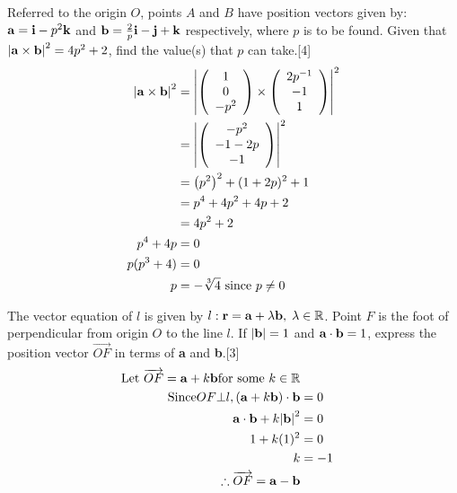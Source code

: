 \documentclass[12pt, a4 paper]{article}
\begin{document}
\begin{outline}[enumerate]
	\color{black}
	\1 Referred to the origin $O$, points $A$ and $B$ have position vectors given by: ${\bf{a}} = {\bf{i}} - {p^2}{\bf{k}}$ and ${\bf{b}} = \frac{2}{p}{\bf{i}} - {\bf{j}} + {\bf{k}}$ respectively, where $p$ is to be found. Given that ${\left| {{\bf{a}} \times {\bf{b}}} \right|^2} = 4{p^2} + 2$, find the value(s) that $p$ can take.\hfill[4]
	\color{blue}
	\begin{align*}
		{\left| {{\bf{a}} \times {\bf{b}}} \right|^2} & = {\left| {\left( {\begin{array}{*{20}{c}}1 \\0\\{ - {p^2}}\end{array}} \right) \times \left( {\begin{array}{*{20}{c}}{2{p^{ - 1}}}\\{ - 1}\\1\end{array}} \right)} \right|^2}\\ &= {\left| {\left( {\begin{array}{*{20}{c}}{ - {p^2}}\\{ - 1 - 2p}\\{ - 1}\end{array}} \right)} \right|^2}\\ &= {\left( {{p^2}} \right)^2} + {(1 + 2p)^2} + 1\\ &= {p^4} + 4{p^2} + 4p + 2\\ &= 4{p^2} + 2\\p^4 + 4p &= 0\\p({p^3} + 4) &= 0\\p &=  - \sqrt[3]{4} \textrm{   since } p \ne 0
	\end{align*}
							        
	\color{black}
	\1 The vector equation of $l$ is given by $l:{\bf{r}} = {\bf{a}} + \lambda {\bf{b}},\;\lambda  \in \mathbb{R}$. Point $F$ is the foot of perpendicular from origin $O$ to the line $l$. If $\left| {\bf{b}} \right| = 1$ and ${\bf{a}} \cdot {\bf{b}} = 1$, express the position vector $\overrightarrow {OF}$ in terms of \textbf{a} and \textbf{b}.\hfill[3]
	\color{blue}
	\begin{align*}
		\textrm{Let }\overrightarrow {OF}  = {\bf{a}} + k{\bf{b}} {\textrm{for some }}k \in \mathbb{R}\\
		\textrm{Since}OF \bot l, ({\bf{a}} + k{\bf{b}}) \cdot {\bf{b}} & = 0 \\{\bf{a}} \cdot {\bf{b}} + k{\left| {\bf{b}} \right|^2} &= 0\\1 + k{(1)^2} &= 0\\k &= -1\\\therefore \overrightarrow {OF}  = {\bf{a}} - {\bf{b}}
	\end{align*}
			

\end{outline}
\end{document}
